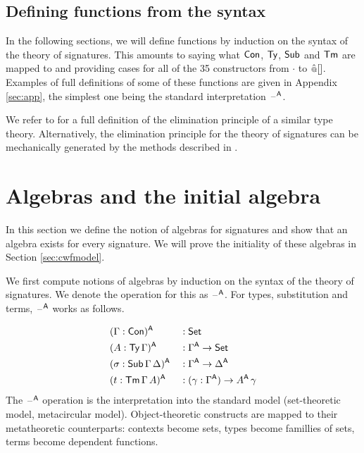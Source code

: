\documentclass[acmsmall,review]{acmart}\settopmatter{printfolios=true,printccs=false,printacmref=false}
\begin{document}
\subsection{Defining functions from the syntax}
\label{sec:syntaxfunctions}

In the following sections, we will define functions by induction on
the syntax of the theory of signatures. This amounts to saying what
$\mathsf{Con}$, $\mathsf{Ty}$, $\mathsf{Sub}$ and $\mathsf{Tm}$ are mapped to and providing cases for
all of the 35 constructors from $\cdot$ to ${\mathop{\hat{\mathop{{\scriptstyle @}}}}[]}$. Examples of
full definitions of some of these functions are given in Appendix
\ref{sec:app}, the simplest one being the standard interpretation
$\mathord{\hspace{1pt}\text{--}\hspace{1pt}}^{\mathsf{A}}$.

We refer to \cite{ttintt} for a full definition of the elimination
principle of a similar type theory. Alternatively, the elimination
principle for the theory of signatures can be mechanically generated
by the methods described in \cite{kaposi_et_al:LIPIcs:2018:9190}.


\section{Algebras and the initial algebra}
\label{sec:algebras}

In this section we define the notion of algebras for signatures and
show that an algebra exists for every signature. We will prove
the initiality of these algebras in Section \ref{sec:cwfmodel}.

We first compute notions of algebras by induction on the syntax of the
theory of signatures. We denote the operation for this as $\mathord{\hspace{1pt}\text{--}\hspace{1pt}}^{\mathsf{A}}$.
For types, substitution and terms, $\mathord{\hspace{1pt}\text{--}\hspace{1pt}}^{\mathsf{A}}$ works as follows.

\begin{alignat*}{5}
  & (\Gamma:\mathsf{Con})^{\mathsf{A}} && : \mathsf{Set} \\
  & (A:\mathsf{Ty}\,\Gamma)^{\mathsf{A}} && : \Gamma^{\mathsf{A}}\rightarrow\mathsf{Set} \\
  & (\sigma:\mathsf{Sub}\,\Gamma\,\Delta)^{\mathsf{A}} && : \Gamma^{\mathsf{A}}\rightarrow\Delta^{\mathsf{A}} \\
  & (t:\mathsf{Tm}\,\Gamma\,A)^{\mathsf{A}} && : (\gamma:\Gamma^{\mathsf{A}})\rightarrow A^{\mathsf{A}}\,\gamma
\end{alignat*}
The $\mathord{\hspace{1pt}\text{--}\hspace{1pt}}^{\mathsf{A}}$ operation is the interpretation into the standard
model (set-theoretic model, metacircular model). Object-theoretic
constructs are mapped to their metatheoretic counterparts: contexts
become sets, types become famillies of sets, terms become dependent
functions.
\end{document}
